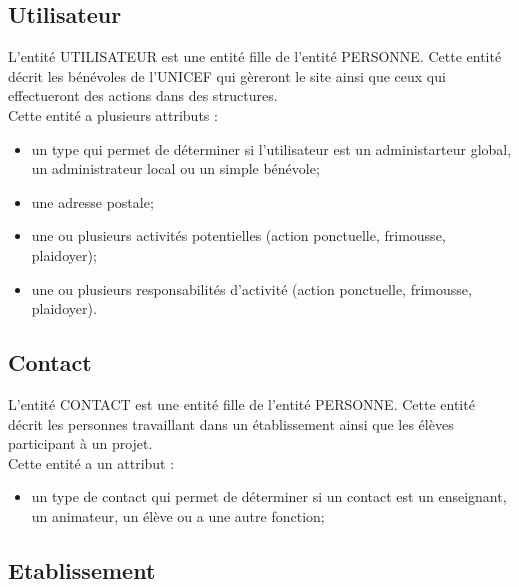 \documentclass[asi, sansVersion]{picInsa}
\begin{document}
\subsection*{Utilisateur}

L'entité UTILISATEUR est une entité fille de l'entité PERSONNE. Cette entité décrit les bénévoles de l'UNICEF qui gèreront le site ainsi que ceux qui effectueront des actions dans des structures. \\
Cette entité a plusieurs attributs : 
\begin{itemize} 
\item un type qui permet de déterminer si l'utilisateur est un administarteur global, un administrateur local ou un simple bénévole;
\item une adresse postale;
\item une ou plusieurs activités potentielles (action ponctuelle, frimousse, plaidoyer); %
\item une ou plusieurs responsabilités d'activité (action ponctuelle, frimousse, plaidoyer). 
\end{itemize}

\subsection*{Contact}

L'entité CONTACT est une entité fille de l'entité PERSONNE. Cette entité décrit les personnes travaillant dans un établissement ainsi que les élèves participant à un projet. \\
Cette entité a un attribut : 
\begin{itemize}
\item un type de contact qui permet de déterminer si un contact est un enseignant, un animateur, un élève ou a une autre fonction; 
\end{itemize} 

\subsection*{Etablissement}
\end{document}
